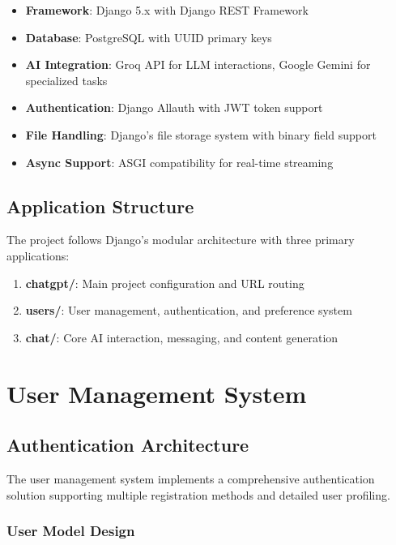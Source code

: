 \documentclass[12pt,a4paper]{article}
\begin{document}
\begin{itemize}
    \item \textbf{Framework}: Django 5.x with Django REST Framework
    \item \textbf{Database}: PostgreSQL with UUID primary keys
    \item \textbf{AI Integration}: Groq API for LLM interactions, Google Gemini for specialized tasks
    \item \textbf{Authentication}: Django Allauth with JWT token support
    \item \textbf{File Handling}: Django's file storage system with binary field support
    \item \textbf{Async Support}: ASGI compatibility for real-time streaming
\end{itemize}

\subsection{Application Structure}

The project follows Django's modular architecture with three primary applications:

\begin{enumerate}
    \item \textbf{chatgpt/}: Main project configuration and URL routing
    \item \textbf{users/}: User management, authentication, and preference system
    \item \textbf{chat/}: Core AI interaction, messaging, and content generation
\end{enumerate}

\section{User Management System}

\subsection{Authentication Architecture}

The user management system implements a comprehensive authentication solution supporting multiple registration methods and detailed user profiling.

\subsubsection{User Model Design}
\end{document}
